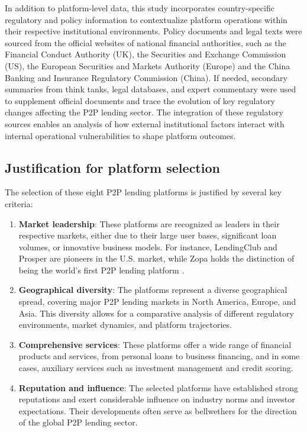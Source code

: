 \documentclass[pdflatex,sn-apa]{sn-jnl}%
\theoremstyle{thmstyleone}%
\theoremstyle{thmstyletwo}%
\theoremstyle{thmstylethree}%
\begin{document}
In addition to platform-level data, this study incorporates country-specific regulatory and policy information to contextualize platform operations within their respective institutional environments. Policy documents and legal texts were sourced from the official websites of national financial authorities, such as the Financial Conduct Authority (UK), the Securities and Exchange Commission (US), the European Securities and Markets Authority (Europe) and the China Banking and Insurance Regulatory Commission (China). If needed, secondary summaries from think tanks, legal databases, and expert commentary were used to supplement official documents and trace the evolution of key regulatory changes affecting the P2P lending sector. The integration of these regulatory sources enables an analysis of how external institutional factors interact with internal operational vulnerabilities to shape platform outcomes.

\subsection{Justification for platform selection}
The selection of these eight P2P lending platforms is justified by several key criteria:

\begin{enumerate}
    \item \textbf{Market leadership}: These platforms are recognized as leaders in their respective markets, either due to their large user bases, significant loan volumes, or innovative business models. For instance, LendingClub and Prosper are pioneers in the U.S. market, while Zopa holds the distinction of being the world’s first P2P lending platform \citep{bednorz_history_2023}.
    
    \item \textbf{Geographical diversity}: The platforms represent a diverse geographical spread, covering major P2P lending markets in North America, Europe, and Asia. This diversity allows for a comparative analysis of different regulatory environments, market dynamics, and platform trajectories.
    
    \item \textbf{Comprehensive services}: These platforms offer a wide range of financial products and services, from personal loans to business financing, and in some cases, auxiliary services such as investment management and credit scoring. 
    
    \item \textbf{Reputation and influence}: The selected platforms have established strong reputations and exert considerable influence on industry norms and investor expectations. Their developments often serve as bellwethers for the direction of the global P2P lending sector.
\end{enumerate}
\end{document}

